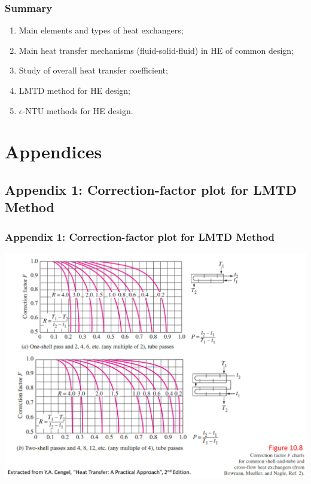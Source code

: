 \documentclass[10pt,compress,unknownkeysallowed]{beamer}
\begin{document}
\begin{frame}
  \frametitle{Summary}
    \begin{enumerate}
       \item Main elements and types of heat exchangers;
       \item Main heat transfer mechanisms (fluid-solid-fluid) in HE of common design;
       \item Study of overall heat transfer coefficient;
       \item LMTD method for HE design;
       \item $\epsilon$-NTU methods for HE design.
    \end{enumerate}
\end{frame}








\section{Appendices}

\subsection{Appendix 1: Correction-factor plot for LMTD Method}\label{appendix1}

\begin{frame}
  \frametitle{Appendix 1: Correction-factor plot for LMTD Method}
    \begin{center}
         \includegraphics[width=1.\columnwidth,height=0.65\columnwidth,clip]{./Pics/HE_FFactor1}
    \end{center}
\end{frame}
\end{document}
